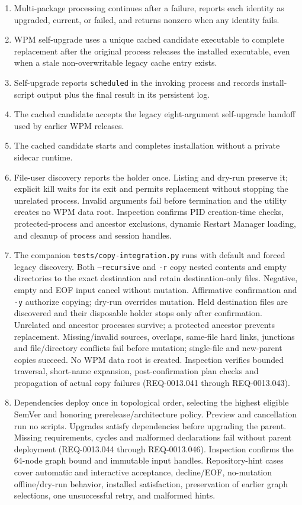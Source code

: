 \documentclass[letterpaper]{article}
\begin{document}
{\begin{enumerate}
\item Multi-package processing continues after a failure, reports each identity as upgraded, current, or failed, and returns nonzero when any identity fails.
\item WPM self-upgrade uses a unique cached candidate executable to complete replacement after the original process releases the installed executable, even when a stale non-overwritable legacy cache entry exists.
\item Self-upgrade reports \texttt{scheduled} in the invoking process and records install-script output plus the final result in its persistent log.
\item The cached candidate accepts the legacy eight-argument self-upgrade handoff used by earlier WPM releases.
\item The cached candidate starts and completes installation without a private sidecar runtime.
\item File-user discovery reports the holder once. Listing and dry-run preserve it; explicit kill waits for its exit and permits replacement without stopping the unrelated process. Invalid arguments fail before termination and the utility creates no WPM data root. Inspection confirms PID creation-time checks, protected-process and ancestor exclusions, dynamic Restart Manager loading, and cleanup of process and session handles.
\item The companion \texttt{tests/copy-integration.py} runs with default and forced legacy discovery. Both \texttt{--recursive} and \texttt{-r} copy nested contents and empty directories to the exact destination and retain destination-only files. Negative, empty and EOF input cancel without mutation. Affirmative confirmation and \texttt{-y} authorize copying; dry-run overrides mutation. Held destination files are discovered and their disposable holder stops only after confirmation. Unrelated and ancestor processes survive; a protected ancestor prevents replacement. Missing/invalid sources, overlaps, same-file hard links, junctions and file/directory conflicts fail before mutation; single-file and new-parent copies succeed. No WPM data root is created. Inspection verifies bounded traversal, short-name expansion, post-confirmation plan checks and propagation of actual copy failures (REQ-0013.041 through REQ-0013.043).
\item Dependencies deploy once in topological order, selecting the highest eligible SemVer and honoring prerelease/architecture policy. Preview and cancellation run no scripts. Upgrades satisfy dependencies before upgrading the parent. Missing requirements, cycles and malformed declarations fail without parent deployment (REQ-0013.044 through REQ-0013.046). Inspection confirms the 64-node graph bound and immutable input handles. Repository-hint cases cover automatic and interactive acceptance, decline/EOF, no-mutation offline/dry-run behavior, installed satisfaction, preservation of earlier graph selections, one unsuccessful retry, and malformed hints.
\end{enumerate}}
\def\TCPostConditions{All temporary package sources, archives, repository caches, deployment markers, configuration, audit data, and WPM data directories are removed.}
\TCTemplate
\end{document}
